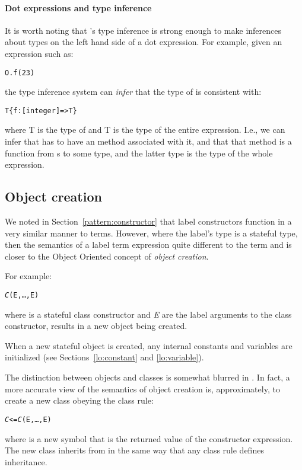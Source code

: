 \paragraph{Dot expressions and type inference}
It is worth noting that \go's type inference is strong enough to make inferences about types on the left hand side of a dot expression. For example, given an expression such as:
\begin{alltt}
O.f(23)
\end{alltt}
the type inference system can \emph{infer} that the type of  is consistent with:
\begin{alltt}
T \impl \{ f:[integer]=>T \}
\end{alltt}
where T is the type of  and T is the type of the entire expression. I.e., we can infer that  has to have an  method associated with it, and that that method is a function from s to some type, and the latter type is the type of the whole expression.


\subsection{Object creation}
\label{expression:object:new}

We noted in Section~\vref{pattern:constructor} that label constructors function in a very similar manner to \prolog terms. However, where the label's type is a stateful type, then the semantics of a label term expression quite different to the \prolog term and is closer to the Object Oriented concept of \emph{object creation}.

For example:
\begin{alltt}
\emph{C}(E,\ldots,E\subn)
\end{alltt}
where  is a stateful class constructor and \emph{E\subi} are the label arguments to the class constructor, results in a new object being created.

When a new stateful object is created, any internal constants and variables are initialized (see Sections~\vref{lo:constant} and \vref{lo:variable}). 

The distinction between objects and classes is somewhat blurred in \go. In fact, a more accurate view of the semantics of object creation is, approximately, to create a new class obeying the class rule:
\begin{alltt}
\emph{C} <= \emph{C}(E,\ldots,E\subn)
\end{alltt}
where  is a new symbol that is the returned value of the constructor expression. The new class inherits from  in the same way that any class rule defines inheritance.

